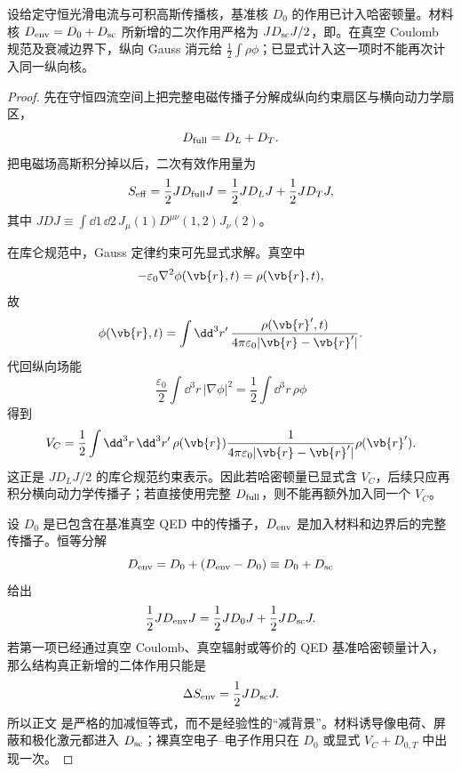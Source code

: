 \begin{proposition}[高斯核消元的基准差分恒等式]
设给定守恒光滑电流与可积高斯传播核，基准核 $D_0$ 的作用已计入哈密顿量。材料核 $D_{\rm env}=D_0+D_{\rm sc}$ 所新增的二次作用严格为 $JD_{\rm sc}J/2$，即。在真空 Coulomb 规范及衰减边界下，纵向 Gauss 消元给 $\frac12\int\rho\phi$；已显式计入这一项时不能再次计入同一纵向核。
\end{proposition}
\begin{proof}
先在守恒四流空间上把完整电磁传播子分解成纵向约束扇区与横向动力学扇区，
\[
D_{\rm full}=D_L+D_T.
\]
把电磁场高斯积分掉以后，二次有效作用量为
\[
S_{\rm eff}=\frac12 JD_{\rm full}J
=\frac12 JD_LJ+\frac12 JD_TJ,
\]
其中 $JDJ\equiv\int\dd1\,\dd2\,J_\mu(1)D^{\mu\nu}(1,2)J_\nu(2)$。

在库仑规范中，Gauss 定律约束可先显式求解。真空中
\[
-\varepsilon_0\nabla^2\phi(\vb{r},t)=\rho(\vb{r},t),
\]
故
\[
\phi(\vb{r},t)
=\int\dd^3r'\,
\frac{\rho(\vb{r}',t)}{4\pi\varepsilon_0|\vb{r}-\vb{r}'|}.
\]
代回纵向场能
\[
\frac{\varepsilon_0}{2}\int\dd^3r\,|\nabla\phi|^2
=\frac12\int\dd^3r\,\rho\phi
\]
得到
\[
V_C
=\frac12\int\dd^3r\,\dd^3r'\,
\rho(\vb{r})
\frac{1}{4\pi\varepsilon_0|\vb{r}-\vb{r}'|}
\rho(\vb{r}').
\]
这正是 $JD_LJ/2$ 的库仑规范约束表示。因此若哈密顿量已显式含 $V_C$，后续只应再积分横向动力学传播子；若直接使用完整 $D_{\rm full}$，则不能再额外加入同一个 $V_C$。

设 $D_0$ 是已包含在基准真空 QED 中的传播子，$D_{\rm env}$ 是加入材料和边界后的完整传播子。恒等分解
\[
D_{\rm env}=D_0+(D_{\rm env}-D_0)\equiv D_0+D_{\rm sc}
\]
给出
\[
\frac12JD_{\rm env}J
=\frac12JD_0J+\frac12JD_{\rm sc}J.
\]
若第一项已经通过真空 Coulomb、真空辐射或等价的 QED 基准哈密顿量计入，那么结构真正新增的二体作用只能是
\[
\Delta S_{\rm env}=\frac12JD_{\rm sc}J.
\]
所以正文 是严格的加减恒等式，而不是经验性的“减背景”。材料诱导像电荷、屏蔽和极化激元都进入 $D_{\rm sc}$；裸真空电子--电子作用只在 $D_0$ 或显式 $V_C+D_{0,T}$ 中出现一次。
\end{proof}


